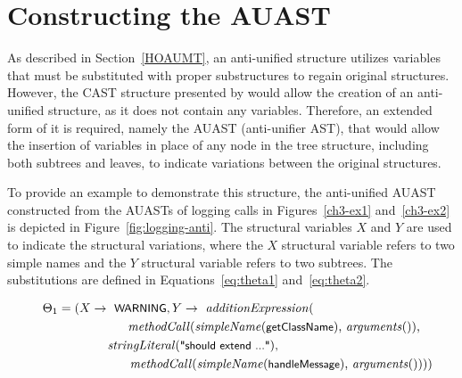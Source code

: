 \section{Constructing the AUAST}  \label{auast}
%
As described in Section~\ref{HOAUMT}, an anti-unified structure utilizes variables that must be substituted with proper substructures to regain original structures. However, the CAST structure presented by \citet{2008:fse:cottrell} would allow the creation of an anti-unified structure, as it does not contain any variables. Therefore, an extended form of it is required, namely the AUAST (anti-unifier AST), that would allow the insertion of variables in place of any node in the tree structure, including both subtrees and leaves, to indicate variations between the original structures.

To provide an example to demonstrate this structure, the anti-unified AUAST constructed from the AUASTs of logging calls in Figures~\ref{ch3-ex1} and~\ref{ch3-ex2} is depicted in Figure~\ref{fig:logging-anti}. The structural variables $X$ and $Y$ are used to indicate the structural variations, where the $X$ structural variable refers to two simple names and the $Y$ structural variable refers to two subtrees. The substitutions are defined in Equations~\ref{eq:theta1} and~\ref{eq:theta2}.


\begin{align}
\Theta_1 = (X \rightarrow \text{ \textsf{\small WARNING}}, Y \rightarrow \text{ \textit{additionExpression}(}\hspace*{3cm}\nonumber\\
\text{\textit{methodCall}(\textit{simpleName}(\textsf{\small getClassName}), \textit{arguments}()),}\nonumber\\
\text{\textit{stringLiteral}(\textsf{\small "should extend ..."}),}\hspace*{4cm}\nonumber\\
\text{\textit{methodCall}(\textit{simpleName}(\textsf{\small handleMessage}), \textit{arguments}()))})\hspace*{-1em}\label{eq:theta1}
\end{align}


